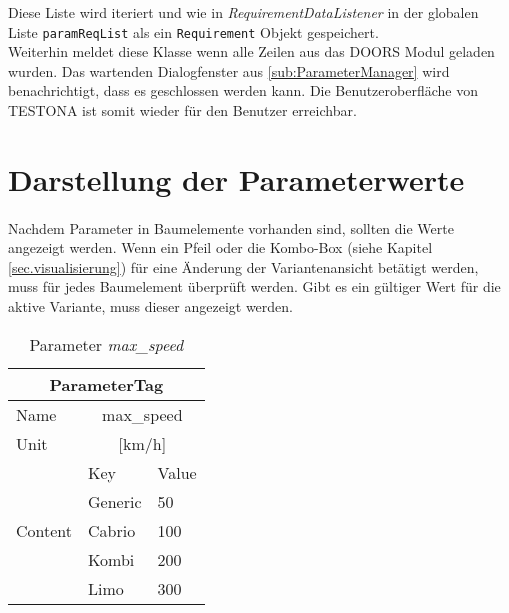 Diese Liste wird iteriert und wie in \textit{RequirementDataListener} in der globalen Liste \texttt{paramReqList} als ein \texttt{Requirement} Objekt gespeichert.\\

Weiterhin meldet diese Klasse wenn alle Zeilen aus das DOORS Modul geladen wurden. Das wartenden Dialogfenster aus \ref{sub:ParameterManager} wird benachrichtigt, dass es geschlossen werden kann. Die Benutzeroberfläche von TESTONA ist somit wieder für den Benutzer erreichbar.



\newpage
\section{Darstellung der Parameterwerte}\label{sec.LoesungVisualisierung}
\paragraph{}

Nachdem Parameter in Baumelemente vorhanden sind, sollten die Werte angezeigt werden. Wenn ein Pfeil oder die Kombo-Box (siehe Kapitel \ref{sec.visualisierung}) für eine Änderung der Variantenansicht betätigt werden, muss für jedes Baumelement überprüft werden. Gibt es ein gültiger Wert für die aktive Variante, muss dieser angezeigt werden.\\

 
\begin{table}[h]
\begin{center}
	\begin{tabular}{|l||ll|}
	 \hline
	 \multicolumn{3}{|c|}{ParameterTag}\\
	 \hline\hline
	 Name		& \multicolumn{2}{|c|}{max\_speed}\\
	 \hline
	 Unit		& \multicolumn{2}{|c|}{[km/h]}\\
	 \hline
	 \multirow{5}{*}{Content}	&Key			&Value\\ \cline{2-3}
	 							&Generic		&50\\
	 							&Cabrio		&100\\
	 							&Kombi		&200\\
	 							&Limo		&300\\
	 \hline
	\end{tabular}
	\caption{Parameter \textit{max\_speed}}
	\label{table:ParameterTagStruktur}
\end{center}
\end{table}


